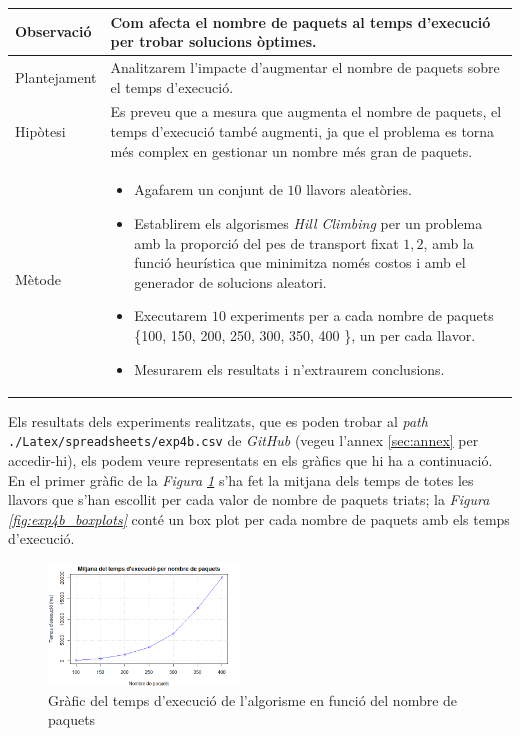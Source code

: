 \documentclass[a4paper]{article}
\begin{document}
	\begin{table}[ht]
		\centering
		\begin{tabular}{|l|p{10cm}|}
			\hline
			Observació & Com afecta el nombre de paquets al temps d'execució per trobar solucions òptimes. \\
			\hline
			Plantejament & Analitzarem l'impacte d'augmentar el nombre de paquets sobre el temps d'execució.\\
			\hline
			Hipòtesi & Es preveu que a mesura que augmenta el nombre de paquets, el temps d'execució també augmenti, ja que el problema es torna més complex en gestionar un nombre més gran de paquets.\\
			\hline
			Mètode &
			\begin{itemize}
				\item Agafarem un conjunt de $10$ llavors aleatòries.
				\item Establirem els algorismes \textit{Hill Climbing} per un problema amb la proporció del pes de transport fixat  $1,2$, amb la funció heurística que minimitza només costos i amb el generador de solucions aleatori.
				\item Executarem $10$ experiments per a cada nombre de paquets \{100, 150, 200, 250, 300, 350, 400 \}, un per cada llavor.
				\item Mesurarem els resultats i n'extraurem conclusions.
			\end{itemize} \\
			\hline
		\end{tabular}
		\label{tab:exp4b_apartats}
	\end{table}
	
	Els resultats dels experiments realitzats, que es poden trobar al \textit{path} \texttt{./Latex/spreadsheets/exp4b.csv} de \textit{GitHub} (vegeu l'annex \ref{sec:annex} per accedir-hi), els podem veure representats en els gràfics que hi ha a continuació. En el primer gràfic de la \textit{Figura \ref{fig:exp4b_grafic_lineal2}} s'ha fet la mitjana dels temps de totes les llavors que s'han escollit per cada valor de nombre de paquets triats; la \textit{Figura \ref{fig:exp4b_boxplots}} conté un box plot per cada nombre de paquets amb els temps d'execució.\\
	
	\begin{figure}[H]
		\centering
		\includegraphics[width=0.45\textwidth]{images/exp4b_grafic_lineal2.png}
		\caption{Gràfic del temps d'execució de l'algorisme en funció del nombre de paquets}
		\label{fig:exp4b_grafic_lineal2}
	\end{figure}
	
\end{document}
